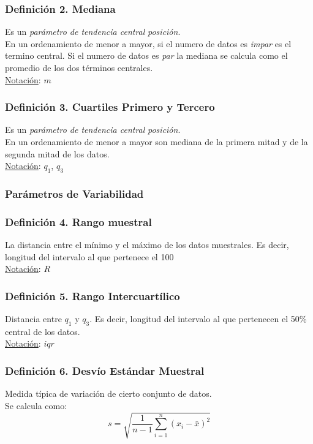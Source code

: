 \documentclass{article}
\newcommand{\sumatoria}[2]{\sum_{#1} ^{#2}}
\begin{document}
\subsubsection*{Definición 2. Mediana}
Es un \emph{parámetro de tendencia central} \emph{posición}.
\\En un ordenamiento de menor a mayor, si el numero de datos es \emph{impar} es el termino central.
Si el numero de datos es \emph{par} la mediana se calcula como el promedio de los dos términos centrales.
\\\underline{Notación}: $m$

\subsubsection*{Definición 3. Cuartiles Primero y Tercero}
Es un \emph{parámetro de tendencia central} \emph{posición}.
\\En un ordenamiento de menor a mayor son mediana de la primera mitad y de la segunda mitad de los datos.
\\\underline{Notación}: $q_1$, $q_3$

\subsubsection{Parámetros de Variabilidad}
\subsubsection*{Definición 4. Rango muestral}
La distancia entre el mínimo y el máximo de los datos muestrales.
Es decir, longitud del intervalo al que pertenece el 100%
\\\underline{Notación}: $R$

\subsubsection*{Definición 5. Rango Intercuartílico}
Distancia entre $q_1$ y $q_3$. Es decir, longitud del intervalo al que pertenecen el 50\% central de los datos.
\\\underline{Notación}: $iqr$

\subsubsection*{Definición 6. Desvío Estándar Muestral}
Medida típica de variación de cierto conjunto de datos.
\\Se calcula como:
\begin{equation*}
    s = \sqrt{\frac{1}{n-1} \sumatoria{i=1}{n} (x_i - \bar{x})^2}
\end{equation*}
\end{document}
